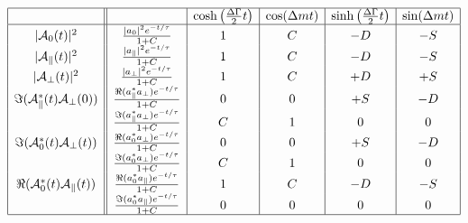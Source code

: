 \documentclass[a4paper,9pt,twoside]{article}
\begin{document}
\begin{equation}
\begin{array}{|c|| c | c | c | c | c |}
 \hline
                                             &                          &  \cosh\left(\frac{\Delta\Gamma}{2}t\right) &  \cos(\Delta m t)  & \sinh\left(\frac{\Delta\Gamma}{2}t\right) &\sin(\Delta m t)  \\
 \hline
|{\cal A}_0(t)|^2                           &\frac{  | a_0 |^2 e^{-t/\tau}}{1+C}                  & 1    &   C  &  -D & -S   \\
|{\cal A}_\parallel(t)|^2                   &\frac{  | a_\parallel |^2 e^{-t/\tau}}{1+C}          & 1    &   C  &  -D & -S   \\
|{\cal A}_\perp(t)|^2                       &\frac{  | a_\perp |^2 e^{-t/\tau}}{1+C}              & 1    &   C  &  +D & +S   \\
\Im({\cal A}_\parallel^*(t){\cal A}_\perp(0)) &\frac{  \Re(a_\parallel^* a_\perp)e^{-t/\tau}}{1+C}& 0      &   0       &  +S & -D   \\                         
                                            &\frac{  \Im(a_\parallel^* a_\perp)e^{-t/\tau}}{1+C}  & C &   1     &   0 & 0    \\
\Im({\cal A}_0^*(t){\cal A}_\perp(t))         &\frac{  \Re(a_0^* a_\perp)e^{-t/\tau}}{1+C}        & 0      &   0       &  +S & -D   \\
                                            &\frac{  \Im(a_0^* a_\perp)e^{-t/\tau}}{1+C}          & C &   1     &   0 &  0   \\
\Re({\cal A}_0^*(t){\cal A}_\parallel(t))     &\frac{  \Re(a_0^*a_\parallel)e^{-t/\tau}}{1+C}     & 1    &   C  &  -D & -S   \\
                                            &\frac{  \Im(a_0^*a_\parallel)e^{-t/\tau}}{1+C}       & 0      &   0       &   0 &  0   \\
\hline

\end{array}
\end{equation}
\end{document}
